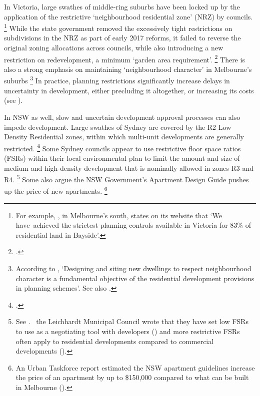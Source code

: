 In Victoria, large swathes of middle-ring suburbs have been locked up by the application of the restrictive `neighbourhood residential zone' (NRZ) by councils.%
    \footnote{\textcites{VICDepEnvironLWP2017}
	For example, \textcite{BaysideHousing2017}, in Melbourne's south, states on its website that `We have~achieved the strictest planning controls available in Victoria for 83\% of residential land in Bayside'.}
While the state government removed the excessively tight restrictions on subdivisions in the NRZ as part of early 2017 reforms, it failed to reverse the original zoning allocations across councils, while also introducing a new restriction on redevelopment, a minimum `garden area requirement'.%
	\footcite{VICDepEnvironLWP2017}
There is also a strong emphasis on maintaining `neighbourhood character' in Melbourne's suburbs%
    \footnote{According to \textcite{VICDepLWP2017Neighbour}, `Designing and siting new dwellings to respect neighbourhood character is a fundamental objective of the residential development provisions in planning schemes'.
    See also \textcites[][91]{Rowley_2017_Vic_planning_system}{Dutta2017Subdivisions}{DoveyEtAl2009Neighbourhood}{Newton-2017-becoming-urban}.}
In practice, planning restrictions significantly increase delays in uncertainty in development, either precluding it altogether, or increasing its costs (see ).

In NSW as well, slow and uncertain development approval processes can also impede development.
Large swathes of Sydney are covered by the R2 Low Density Residential zones, within which multi-unit developments are generally restricted.%
    \footcite{PWC2017sydneyaffordabilitycrisis}
Some Sydney councils appear to use restrictive floor space ratios (FSRs) within their local environmental plan to limit the amount and size of medium and high-density development that is nominally allowed in zones R3 and R4.%
	\footnote{See \textcite{Daley-etal-2017-Submission-NSW-housing-supply-inquiry}.
	\eg~the Leichhardt Municipal Council wrote that they have set low FSRs to use as a negotiating tool with developers (\textcite{Leichhardt2014}) and more restrictive FSRs often apply to residential developments compared to commercial developments (\textcite[][28]{UrbanTaskforce2011}).}
Some also argue the NSW Government's Apartment Design Guide pushes up the price of new apartments.%
    \footnote{An Urban Taskforce report estimated  the NSW apartment guidelines increase the price of an apartment by up to \$150,000 compared to what can be built in Melbourne (\textcite{urbantaskforce2017apartments}).}

